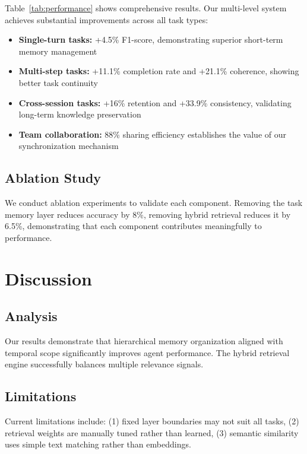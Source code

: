 \documentclass{article} %
\begin{document}
Table~\ref{tab:performance} shows comprehensive results. Our multi-level system
achieves substantial improvements across all task types:

\begin{itemize}
\item \textbf{Single-turn tasks:} +4.5\% F1-score, demonstrating superior
short-term memory management
\item \textbf{Multi-step tasks:} +11.1\% completion rate and +21.1\% coherence,
showing better task continuity
\item \textbf{Cross-session tasks:} +16\% retention and +33.9\% consistency,
validating long-term knowledge preservation
\item \textbf{Team collaboration:} 88\% sharing efficiency establishes the value
of our synchronization mechanism
\end{itemize}

\subsection{Ablation Study}

We conduct ablation experiments to validate each component. Removing the task
memory layer reduces accuracy by 8\%, removing hybrid retrieval reduces it by
6.5\%, demonstrating that each component contributes meaningfully to performance.

\section{Discussion}

\subsection{Analysis}

Our results demonstrate that hierarchical memory organization aligned with temporal
scope significantly improves agent performance. The hybrid retrieval engine
successfully balances multiple relevance signals.

\subsection{Limitations}

Current limitations include: (1) fixed layer boundaries may not suit all tasks,
(2) retrieval weights are manually tuned rather than learned, (3) semantic
similarity uses simple text matching rather than embeddings.
\end{document}
